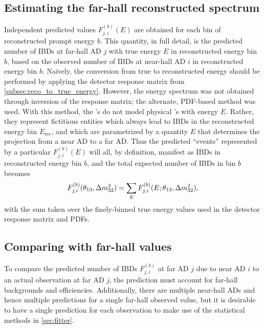 \subsection{Estimating the far-hall reconstructed spectrum}
\label{subsec:true_to_reco_farhall}

Independent predicted values $F_{j,i}^{(b)}(E)$ are obtained
for each bin of reconstructed prompt energy $b$.
This quantity, in full detail,
is the predicted number of IBDs at far-hall AD $j$
with true \nuebar{} energy $E$ in reconstructed energy bin $b$,
based on the observed number of IBDs at near-hall AD $i$
in reconstructed energy bin $b$.
Naively, the conversion from true to reconstructed energy
should be performed by applying the detector response matrix
from \cref{subsec:reco_to_true_energy}.
However, the \nuebar{} energy spectrum was not obtained
through inversion of the response matrix;
the alternate, PDF-based method was used.
With this method, the \nuebar{}'s do not model physical \nuebar{}'s with energy $E$.
Rather, they represent fictitious entities which always
lead to IBDs in the reconstructed energy bin $E_\text{rec}$,
and which are parametrized by a quantity $E$ that determines
the projection from a near AD to a far AD.
Thus the predicted ``events'' represented by a particular
$F_{j,i}^{(b)}(E)$ will all, by definition,
manifest as IBDs in reconstructed energy bin $b$,
and the total expected number of IBDs in bin $b$ becomes
\begin{equation}
    F_{j,i}^{(b)}(\theta_{13},\Delta m^2_{32}) = \sum_E F_{j,i}^{(b)}(E;\theta_{13},\Delta m^2_{32}),
\end{equation}
with the sum taken over the finely-binned true energy values
used in the detector response matrix and PDFs.

\subsection{Comparing with far-hall values}
\label{subsec:far_bg_eff}

To compare the predicted number of IBDs $F_{j,i}^{(b)}$
at far AD $j$ due to near AD $i$
to an actual observation at far AD $j$,
the prediction must account for far-hall backgrounds and efficiencies.
Additionally, there are multiple near-hall ADs
and hence multiple predictions for a single far-hall observed value,
but it is desirable to have a single prediction for each observation
to make use of the statistical methods in \cref{sec:fitter}.

